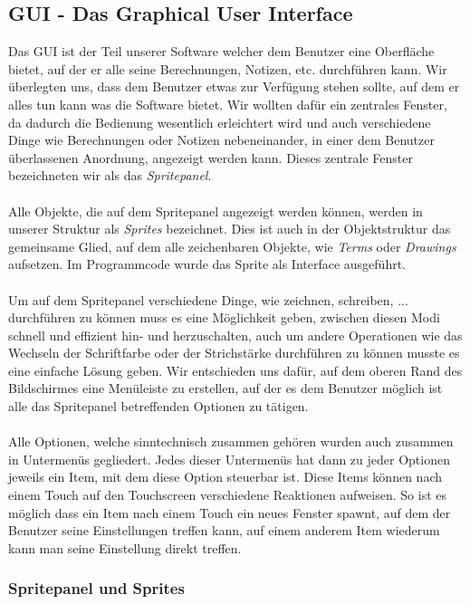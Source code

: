 \subsection{GUI - Das Graphical User Interface}

Das GUI ist der Teil unserer Software welcher dem Benutzer eine Oberfläche bietet, auf der er alle seine Berechnungen, Notizen, etc. durchführen kann. Wir überlegten uns, dass dem Benutzer etwas zur Verfügung stehen sollte, auf dem er alles tun kann was die Software bietet. Wir wollten dafür ein zentrales Fenster, da dadurch die Bedienung wesentlich erleichtert wird und auch verschiedene Dinge wie Berechnungen oder Notizen nebeneinander, in einer dem Benutzer überlassenen Anordnung, angezeigt werden kann. Dieses zentrale Fenster bezeichneten wir als das \textit{Spritepanel}.\\
\\
Alle Objekte, die auf dem Spritepanel angezeigt werden können, werden in unserer Struktur als \textit{Sprites} bezeichnet. Dies ist auch in der Objektstruktur das gemeinsame Glied, auf dem alle zeichenbaren Objekte, wie \textit{Terms} oder \textit{Drawings} aufsetzen. Im Programmcode wurde das Sprite als Interface ausgeführt.\\
\\
Um auf dem Spritepanel verschiedene Dinge, wie zeichnen, schreiben, ... durchführen zu können muss es eine Möglichkeit geben, zwischen diesen Modi schnell und effizient hin- und herzuschalten, auch um andere Operationen wie das Wechseln der Schriftfarbe oder der Strichstärke durchführen zu können musste es eine einfache Lösung geben. Wir entschieden uns dafür, auf dem oberen Rand des Bildschirmes eine Menüleiste zu erstellen, auf der es dem Benutzer möglich ist alle das Spritepanel betreffenden Optionen zu tätigen.\\
\\
Alle Optionen, welche sinntechnisch zusammen gehören wurden auch zusammen in Untermenüs gegliedert. Jedes dieser Untermenüs hat dann zu jeder Optionen jeweils ein Item, mit dem diese Option steuerbar ist. Diese Items können nach einem Touch auf den Touchscreen verschiedene Reaktionen aufweisen. So ist es möglich dass ein Item nach einem Touch ein neues Fenster spawnt, auf dem der Benutzer seine Einstellungen treffen kann, auf einem anderem Item wiederum kann man seine Einstellung direkt treffen.\\

\subsubsection{Spritepanel und Sprites}

